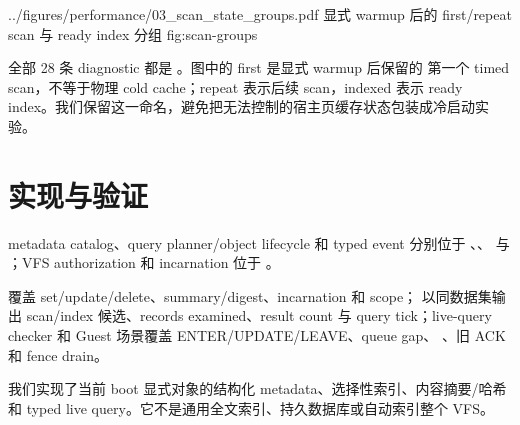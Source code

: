   {../figures/performance/03_scan_state_groups.pdf}
  {显式 warmup 后的 first/repeat scan 与 ready index 分组}
  {fig:scan-groups}

全部 28 条 diagnostic 都是 。图中的 first 是显式 warmup 后保留的
第一个 timed scan，不等于物理 cold cache；repeat 表示后续 scan，indexed 表示 ready
index。我们保留这一命名，避免把无法控制的宿主页缓存状态包装成冷启动实验。

\section{实现与验证}

metadata catalog、query planner/object lifecycle 和 typed event 分别位于
、、
 与 ；VFS authorization
和 incarnation 位于 。

 覆盖 set/update/delete、summary/digest、incarnation 和 scope；
 以同数据集输出 scan/index 候选、records examined、result count
与 query tick；live-query checker 和 Guest 场景覆盖 ENTER/UPDATE/LEAVE、queue gap、
、旧 ACK 和 fence drain。

\begin{evidencebox}[任务四结论]
我们实现了当前 boot 显式对象的结构化 metadata、选择性索引、内容摘要/哈希和 typed
live query。它不是通用全文索引、持久数据库或自动索引整个 VFS。
\end{evidencebox}
